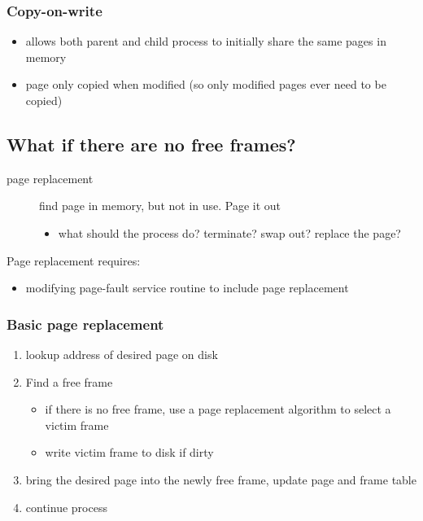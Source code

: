 \documentclass[11pt]{article}
\begin{document}
\subsubsection{Copy-on-write}
\label{sec:org2d402ca}
\begin{itemize}
\item allows both parent and child process to initially share the same pages in memory
\item page only copied when modified (so only modified pages ever need to be copied)
\end{itemize}
\subsection{What if there are no free frames?}
\label{sec:org641542d}
\begin{description}
\item[{page replacement}] find page in memory, but not in use. Page it out
\begin{itemize}
\item what should the process do? terminate? swap out? replace the page?
\end{itemize}
\end{description}
Page replacement requires:
\begin{itemize}
\item modifying page-fault service routine to include page replacement
\end{itemize}
\subsubsection{Basic page replacement}
\label{sec:org7544edd}
\begin{enumerate}
\item lookup address of desired page on disk
\item Find a free frame
\begin{itemize}
\item if there is no free frame, use a page replacement algorithm to select a victim frame
\item write victim frame to disk if dirty
\end{itemize}
\item bring the desired page into the newly free frame, update page and frame table
\item continue process
\end{enumerate}
\end{document}
